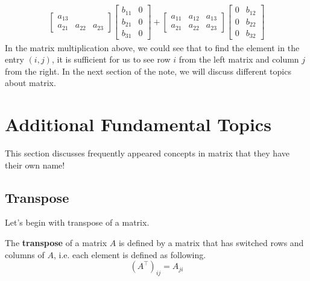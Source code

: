 \documentclass[../main.tex]{subfiles}
\begin{document}
\begin{align*}
\begin{bmatrix}
    \scriptstyle a_{13} \\
    \scriptstyle a_{21} &
    \scriptstyle a_{22} &
    \scriptstyle a_{23}
\end{bmatrix}
\begin{bmatrix}
    \scriptstyle b_{11} & \scriptstyle 0 \\
    \scriptstyle b_{21} & \scriptstyle 0 \\
    \scriptstyle b_{31} & \scriptstyle 0
\end{bmatrix}
+
\begin{bmatrix}
    \scriptstyle a_{11} &
    \scriptstyle a_{12} &
    \scriptstyle a_{13} \\
    \scriptstyle a_{21} &
    \scriptstyle a_{22} &
    \scriptstyle a_{23}
\end{bmatrix}
\begin{bmatrix}
    \scriptstyle 0 & \scriptstyle b_{12} \\
    \scriptstyle 0 & \scriptstyle b_{22} \\
    \scriptstyle 0 & \scriptstyle b_{32}
\end{bmatrix}
\end{align*}
In the matrix multiplication above, we could see that to find
the element in the entry $(i, j)$, it is sufficient for us to
see row $i$ from the left matrix and column $j$ from the right.
In the next section of the note, we will discuss different
topics about matrix.

\section{Additional Fundamental Topics}

This section discusses frequently appeared concepts in matrix
that they have their own name!

\subsection{Transpose}

Let's begin with transpose of a matrix.

\begin{definition}
The \textbf{transpose} of a matrix $A$ is defined by a matrix that
has switched rows and columns of $A$, i.e. each element is defined
as following.
\[
(A^\intercal)_{ij} = A_{ji}
\]
\end{definition}
\end{document}
